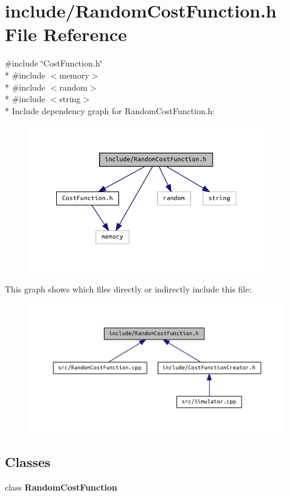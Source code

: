 \section{include/\+Random\+Cost\+Function.h File Reference}
\label{_random_cost_function_8h}
{\ttfamily \#include \char`\"{}Cost\+Function.\+h\char`\"{}}\\*
{\ttfamily \#include $<$memory$>$}\\*
{\ttfamily \#include $<$random$>$}\\*
{\ttfamily \#include $<$string$>$}\\*
Include dependency graph for Random\+Cost\+Function.\+h\+:\nopagebreak
\begin{figure}[H]
\begin{center}
\leavevmode
\includegraphics[width=292pt]{_random_cost_function_8h__incl}
\end{center}
\end{figure}
This graph shows which files directly or indirectly include this file\+:\nopagebreak
\begin{figure}[H]
\begin{center}
\leavevmode
\includegraphics[width=350pt]{_random_cost_function_8h__dep__incl}
\end{center}
\end{figure}
\subsection*{Classes}
\begin{DoxyCompactItemize}
\item 
class {\bf Random\+Cost\+Function}
\end{DoxyCompactItemize}
